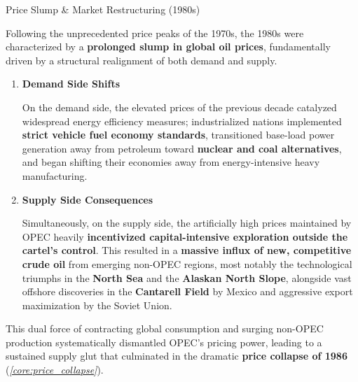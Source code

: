 \documentclass[10pt]{article}
\begin{document}
      \begin{core}[label=core:price_slump]{Price Slump \& Market Restructuring (1980s)}

        Following the unprecedented price peaks of the 1970s, the 1980s were characterized by a \textbf{prolonged slump in global oil prices}, fundamentally driven by a structural realignment of both demand and supply.

        \begin{enumerate}

          \item \textbf{Demand Side Shifts}

          On the demand side, the elevated prices of the previous decade catalyzed widespread energy efficiency measures; industrialized nations implemented \textbf{strict vehicle fuel economy standards}, transitioned base-load power generation away from petroleum toward \textbf{nuclear and coal alternatives}, and began shifting their economies away from energy-intensive heavy manufacturing. 

          \item \textbf{Supply Side Consequences}

          Simultaneously, on the supply side, the artificially high prices maintained by OPEC heavily \textbf{incentivized capital-intensive exploration outside the cartel's control}. This resulted in a \textbf{massive influx of new, competitive crude oil} from emerging non-OPEC regions, most notably the technological triumphs in the \textbf{North Sea} and the \textbf{Alaskan North Slope}, alongside vast offshore discoveries in the \textbf{Cantarell Field} by Mexico and aggressive export maximization by the Soviet Union.

        \end{enumerate}

        This dual force of contracting global consumption and surging non-OPEC production systematically dismantled OPEC's pricing power, leading to a sustained supply glut that culminated in the dramatic \textbf{price collapse of 1986} (\textit{\autoref{core:price_collapse}}).

      \end{core}
\end{document}

